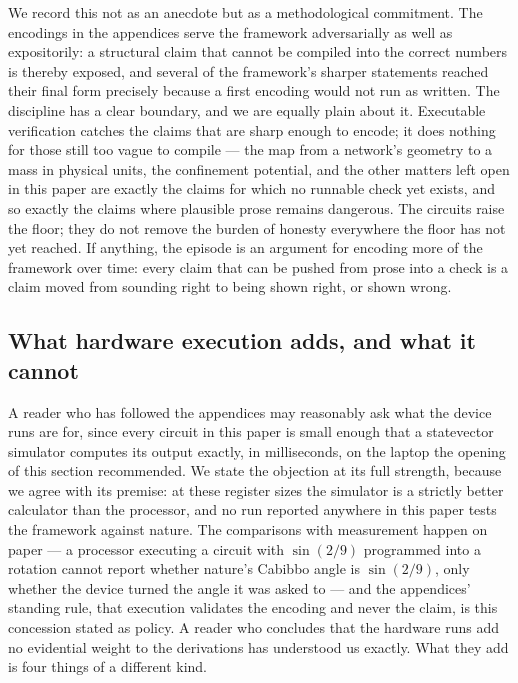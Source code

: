We record this not as an anecdote but as a methodological commitment. The encodings in the
appendices serve the framework adversarially as well as expositorily: a structural claim that cannot
be compiled into the correct numbers is thereby exposed, and several of the framework's sharper
statements reached their final form precisely because a first encoding would not run as written. The
discipline has a clear boundary, and we are equally plain about it. Executable verification catches
the claims that are sharp enough to encode; it does nothing for those still too vague to compile ---
the map from a network's geometry to a mass in physical units, the confinement potential, and the
other matters left open in this paper are exactly the claims for which no runnable check yet exists,
and so exactly the claims where plausible prose remains dangerous. The circuits raise the floor;
they do not remove the burden of honesty everywhere the floor has not yet reached. If anything, the
episode is an argument for encoding more of the framework over time: every claim that can be pushed
from prose into a check is a claim moved from sounding right to being shown right, or shown wrong.

\subsection{What hardware execution adds, and what it cannot}
\label{sec:why-hardware}

A reader who has followed the appendices may reasonably ask what the device runs are for, since
every circuit in this paper is small enough that a statevector simulator computes its output
exactly, in milliseconds, on the laptop the opening of this section recommended. We state the
objection at its full strength, because we agree with its premise: at these register sizes the
simulator is a strictly better calculator than the processor, and no run reported anywhere in
this paper tests the framework against nature. The comparisons with measurement happen on paper
--- a processor executing a circuit with $\sin(2/9)$ programmed into a rotation cannot report
whether nature's Cabibbo angle is $\sin(2/9)$, only whether the device turned the angle it was
asked to --- and the appendices' standing rule, that execution validates the encoding and never
the claim, is this concession stated as policy. A reader who concludes that the hardware runs add
no evidential weight to the derivations has understood us exactly. What they add is four things
of a different kind.

